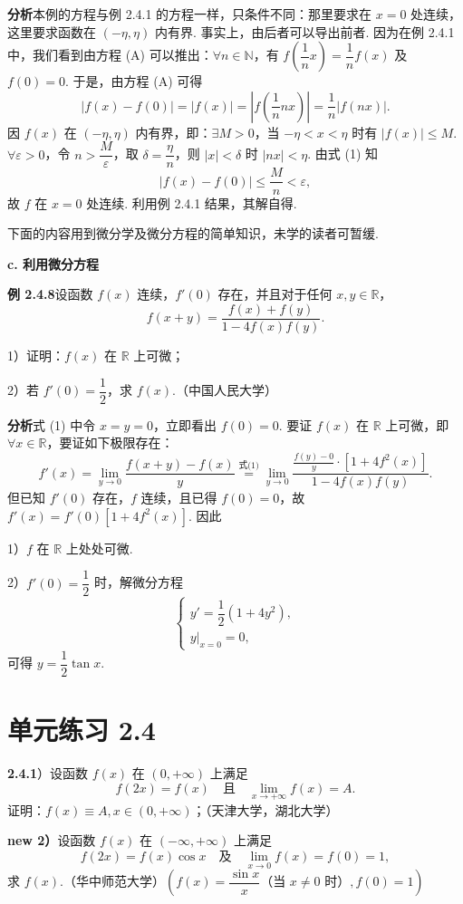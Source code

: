 \documentclass[UTF8, 12pt, fontset=fandol, oneside]{ctexart}
\begin{document}
\noindent\textbf{分析}\quad 本例的方程与例 2.4.1 的方程一样，只条件不同：那里要求在 $x=0$ 处连续，这里要求函数在 $(-\eta,\eta)$ 内有界. 事实上，由后者可以导出前者. 因为在例 2.4.1 中，我们看到由方程 (A) 可以推出：$\forall n\in\mathbb{N}$，有 $f\left(\dfrac1nx\right)=\dfrac1nf(x)$ 及 $f(0)=0$. 于是，由方程 (A) 可得
\[
  |f(x)-f(0)|=|f(x)|=\left|f\left(\frac1nnx\right)\right|=\frac1n|f(nx)|. \tag{1}
\]
因 $f(x)$ 在 $(-\eta,\eta)$ 内有界，即：$\exists M>0$，当 $-\eta<x<\eta$ 时有 $|f(x)|\le M$. $\forall\varepsilon>0$，令 $n>\dfrac M\varepsilon$，取 $\delta=\dfrac\eta n$，则 $|x|<\delta$ 时 $|nx|<\eta$. 由式 (1) 知
\[
  |f(x)-f(0)|\le\frac Mn<\varepsilon,
\]
故 $f$ 在 $x=0$ 处连续. 利用例 2.4.1 结果，其解自得.

下面的内容用到微分学及微分方程的简单知识，未学的读者可暂缓.

\noindent\textbf{c. 利用微分方程}

\noindent\textbf{例 2.4.8}\quad 设函数 $f(x)$ 连续，$f'(0)$ 存在，并且对于任何 $x,y\in\mathbb{R}$，
\[
  f(x+y)=\frac{f(x)+f(y)}{1-4f(x)f(y)}. \tag{1}
\]

1）证明：$f(x)$ 在 $\mathbb{R}$ 上可微；

2）若 $f'(0)=\dfrac12$，求 $f(x)$.（中国人民大学）

\noindent\textbf{分析}\quad 式 (1) 中令 $x=y=0$，立即看出 $f(0)=0$. 要证 $f(x)$ 在 $\mathbb{R}$ 上可微，即 $\forall x\in\mathbb{R}$，要证如下极限存在：
\[
  f'(x)=\lim_{y\to0}\frac{f(x+y)-f(x)}{y}
  \overset{\text{式(1)}}{=}\lim_{y\to0}\frac{\frac{f(y)-0}{y}\cdot[1+4f^2(x)]}{1-4f(x)f(y)}.
\]
但已知 $f'(0)$ 存在，$f$ 连续，且已得 $f(0)=0$，故 $f'(x)=f'(0)[1+4f^2(x)]$. 因此

1）$f$ 在 $\mathbb{R}$ 上处处可微.

2）$f'(0)=\dfrac12$ 时，解微分方程
\[
  \begin{cases}
    y'=\dfrac12(1+4y^2),\\
    y|_{x=0}=0,
  \end{cases}
\]
可得 $y=\dfrac12\tan x$.

\section*{单元练习 2.4}

\noindent\textbf{2.4.1}）设函数 $f(x)$ 在 $(0,+\infty)$ 上满足
\[
  f(2x)=f(x)\quad\text{且}\quad \lim_{x\to+\infty}f(x)=A.
\]
证明：$f(x)\equiv A,x\in(0,+\infty)$；（天津大学，湖北大学）

\noindent\textbf{new 2）}\quad 设函数 $f(x)$ 在 $(-\infty,+\infty)$ 上满足
\[
  f(2x)=f(x)\cos x\quad\text{及}\quad \lim_{x\to0}f(x)=f(0)=1,
\]
求 $f(x)$.（华中师范大学）\hfill$\left(f(x)=\dfrac{\sin x}{x}\text{（当 }x\ne0\text{ 时）},f(0)=1\right)$
\end{document}
